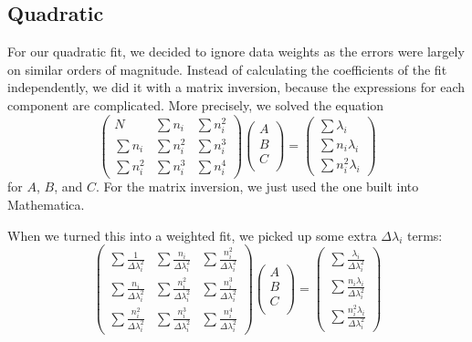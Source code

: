 \documentclass[12pt,twoside]{reedthesis}
\newcommand{\eqn}[1]{\begin{equation}#1\end{equation}}
\begin{document}
\subsection{Quadratic}
For our quadratic fit, we decided to ignore data weights as the errors were largely on similar orders of magnitude.  Instead of calculating the coefficients of the fit independently, we did it with a matrix inversion, because the expressions for each component are complicated. More precisely, we solved the equation
\eqn{
\left(
\begin{array}{ccc}
N & \sum n_i &  \sum n_i^2 \\
\sum n_i & \sum n_i ^2 & \sum n_i^3 \\
\sum n_i ^2 & \sum n_i^3 & \sum n_i ^4
\end{array}
\right)
\left(
\begin{array}{c}
A \\
B \\
C \\
\end{array}
\right)
=
\left(
\begin{array}{c}
\sum \lambda_i \\
\sum n_i \lambda_i \\
\sum n_i^2 \lambda_i
\end{array}
\right)
}
for $A$, $B$, and $C$. For the matrix inversion, we just used the one built into Mathematica. 

When we turned this into a weighted fit, we picked up some extra $\Delta \lambda_i$ terms:
\eqn{
\left(
\begin{array}{ccc}
\sum \frac{1}{\Delta \lambda_i^2} & \sum \frac{n_i}{\Delta \lambda_i^2} &  \sum \frac{n_i^2}{\Delta \lambda_i^2} \\
\sum \frac{n_i}{\Delta \lambda_i^2} & \sum \frac{n_i ^2}{\Delta \lambda_i^2} & \sum \frac{n_i^3}{\Delta \lambda_i^2} \\
\sum \frac{n_i ^2}{\Delta \lambda_i^2} & \sum \frac{n_i^3}{\Delta \lambda_i^2} & \sum \frac{n_i ^4}{\Delta \lambda_i^2}
\end{array}
\right)
\left(
\begin{array}{c}
A \\
B \\
C \\
\end{array}
\right)
=
\left(
\begin{array}{c}
\sum \frac{\lambda_i}{\Delta \lambda_i^2} \\
\sum \frac{n_i \lambda_i}{\Delta \lambda_i^2} \\
\sum \frac{n_i^2 \lambda_i}{\Delta \lambda_i^2}
\end{array}
\right)
}
\end{document}
